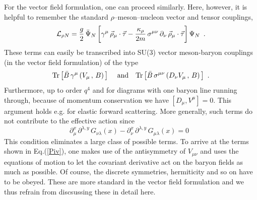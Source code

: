 For the vector field formulation, one can proceed similarly. Here,
however, it is helpful to remember the standard $\rho$--meson--nucleon
vector and tensor couplings,
\begin{equation}
{\cal L}_{\rho N} = \frac{g}{2} \, \bar{\Psi}_N \, \biggl[ \gamma^\mu \,
\vec{\rho}_\mu \cdot \vec{\tau} - \frac{\kappa_\rho}{2m} \,
\sigma^{\mu \nu} \, \partial_\nu \, \vec{\rho}_\mu \cdot \vec{\tau}
\biggr] \, \Psi_N \, \, \, .
\end{equation}
These terms can easily be transcribed into  SU(3) vector meson-baryon
couplings (in the vector field formulation) of the type
\begin{equation}
{\rm Tr} \, \bigl[ \bar{B} \, \gamma^\mu\, ( V_\mu \, , \, B) \, \bigr]
\, \, \quad {\rm and} \quad
{\rm Tr} \, \bigl[ \bar{B} \, \sigma^{\mu \nu}\, ( D_\nu V_\mu \, ,
\, B) \, \bigr] \, \, \, .
\end{equation}
Furthermore, up to order $q^4$ and for  diagrams with one baryon line
running through, because of momentum conservation we have $[D_\mu,
  V^\mu]=0$.  This argument holds e.g. for elastic forward scattering.
More generally, such terms do not contribute to the effective action
since
\begin{equation}
\partial^x_\mu \, \partial^{\lambda , y} \, G_{\nu \lambda} (x) -
\partial^x_\nu \, \partial^{\lambda , y} \, G_{\mu \lambda} (x) = 0 \, \,
\,
\end{equation}
This condition eliminates a large class of possible
terms. To arrive at the terms shown in Eq.(\ref{Piv}), one makes use
of the antisymmetry of $V_{\mu \nu}$ and uses the equations of motion
to let the covariant derivative act on the baryon fields as much as
possible. Of course, the discrete symmetries, hermiticity and so on
have to be obeyed. These are more standard in the vector field
formulation and we thus refrain from discsussing these in detail here.

